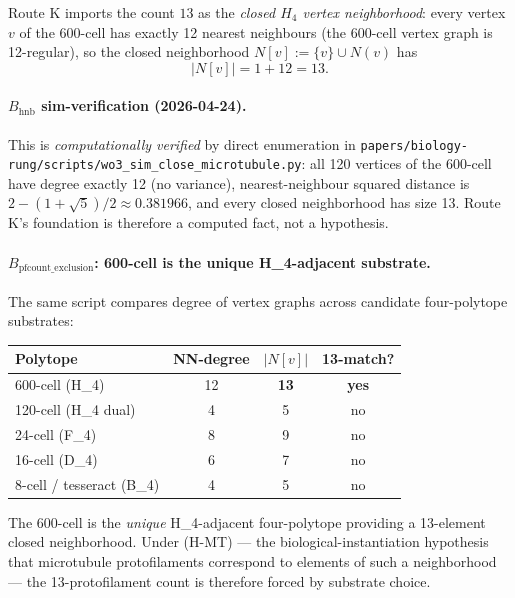 \documentclass[12pt]{article}
\begin{document}
Route K imports the count $13$ as the \emph{closed $H_4$ vertex
neighborhood}: every vertex $v$ of the 600-cell has exactly 12
nearest neighbours (the 600-cell vertex graph is 12-regular), so
the closed neighborhood $N[v] := \{v\} \cup N(v)$ has
\[
|N[v]| = 1 + 12 = 13.
\]

\paragraph{$B_{\mathrm{hnb}}$ sim-verification (2026-04-24).} This
is \emph{computationally verified} by direct enumeration in
\texttt{papers/biology-rung/scripts/wo3\_sim\_close\_microtubule.py}:
all 120 vertices of the 600-cell have degree exactly 12 (no
variance), nearest-neighbour squared distance is
$2 - (1+\sqrt{5})/2 \approx 0.381966$, and every closed
neighborhood has size 13. Route K's foundation is therefore a
computed fact, not a hypothesis.

\paragraph{$B_{\mathrm{pfcount\_exclusion}}$: 600-cell is the unique
H_4-adjacent substrate.} The same script compares degree of
vertex graphs across candidate four-polytope substrates:

\begin{center}
\begin{tabular}{lccc}
\toprule
Polytope & NN-degree & $|N[v]|$ & 13-match? \\
\midrule
600-cell (H\_4) & 12 & \textbf{13} & \textbf{yes} \\
120-cell (H\_4 dual) & 4 & 5 & no \\
24-cell (F\_4) & 8 & 9 & no \\
16-cell (D\_4) & 6 & 7 & no \\
8-cell / tesseract (B\_4) & 4 & 5 & no \\
\bottomrule
\end{tabular}
\end{center}

The 600-cell is the \emph{unique} H\_4-adjacent four-polytope
providing a 13-element closed neighborhood. Under (H-MT)
--- the biological-instantiation hypothesis that microtubule
protofilaments correspond to elements of such a neighborhood
--- the 13-protofilament count is therefore forced by
substrate choice.
\end{document}
